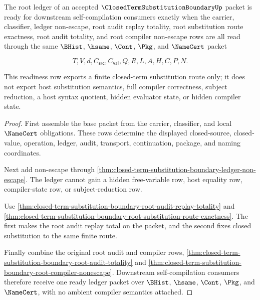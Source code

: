 \begin{theorem}
\label{thm:closed-term-substitution-boundary-root-ledger-readiness}
The root ledger of an accepted $\ClosedTermSubstitutionBoundaryUp$ packet is ready for downstream self-compilation consumers exactly when the carrier, classifier, ledger non-escape, root audit replay totality, root substitution route exactness, root audit totality, and root compiler non-escape rows are all read through the same $\BHist$, $\hsame$, $\Cont$, $\Pkg$, and $\NameCert$ packet

$$
T,V,d,C_{\mathsf{src}},C_{\mathsf{val}},Q,R,L,A,H,C,P,N.
$$

This readiness row exports a finite closed-term substitution route only; it does not export host substitution semantics, full compiler correctness, subject reduction, a host syntax quotient, hidden evaluator state, or hidden compiler state.
\end{theorem}
\begin{proof}
First assemble the base packet from the carrier, classifier, and local $\NameCert$ obligations. These rows determine the displayed closed-source, closed-value, operation, ledger, audit, transport, continuation, package, and naming coordinates.

Next add non-escape through \autoref{thm:closed-term-substitution-boundary-ledger-non-escape}. The ledger cannot gain a hidden free-variable row, host equality row, compiler-state row, or subject-reduction row.

Use \autoref{thm:closed-term-substitution-boundary-root-audit-replay-totality} and \autoref{thm:closed-term-substitution-boundary-root-substitution-route-exactness}. The first makes the root audit replay total on the packet, and the second fixes closed substitution to the same finite route.

Finally combine the original root audit and compiler rows, \autoref{thm:closed-term-substitution-boundary-root-audit-totality} and \autoref{thm:closed-term-substitution-boundary-root-compiler-nonescape}. Downstream self-compilation consumers therefore receive one ready ledger packet over $\BHist$, $\hsame$, $\Cont$, $\Pkg$, and $\NameCert$, with no ambient compiler semantics attached.
\end{proof}

